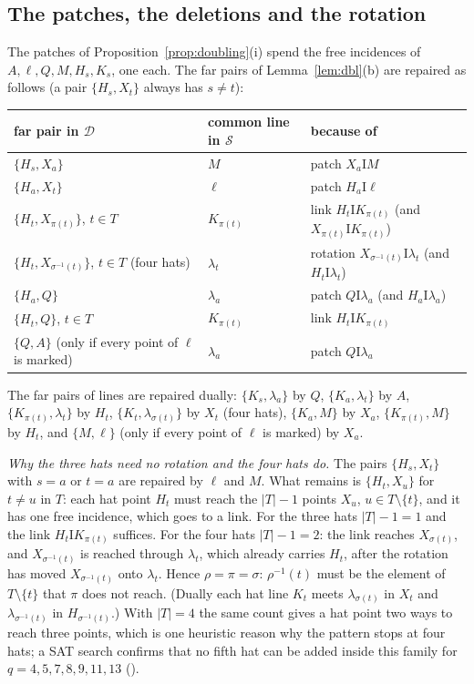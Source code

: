 \documentclass[11pt]{amsart}
\theoremstyle{definition}
\theoremstyle{remark}
\newcommand{\I}{\mathrel{\mathrm{I}}}
\newcommand{\cS}{\mathcal{S}}
\newcommand{\cD}{\mathcal{D}}
\newcommand{\lam}{\lambda}
\begin{document}
\subsection{The patches, the deletions and the rotation}\label{ssec:patches}
The patches of Proposition~\ref{prop:doubling}(i) spend the free incidences of $A,\ell,Q,M,H_s,K_s$, one each. The far pairs of Lemma~\ref{lem:dbl}(b) are repaired as follows (a pair $\{H_s,X_t\}$ always has $s\neq t$):

\begin{center}\small
\renewcommand{\arraystretch}{1.15}
\begin{tabular}{@{}lll@{}}
\toprule
far pair in $\cD$ & common line in $\cS$ & because of\\
\midrule
$\{H_s,X_a\}$ & $M$ & patch $X_a\I M$\\
$\{H_a,X_t\}$ & $\ell$ & patch $H_a\I\ell$\\
$\{H_t,X_{\pi(t)}\}$, $t\in T$ & $K_{\pi(t)}$ & link $H_t\I K_{\pi(t)}$ (and $X_{\pi(t)}\I K_{\pi(t)}$)\\
$\{H_t,X_{\sigma^{-1}(t)}\}$, $t\in T$ (four hats) & $\lam_t$ & rotation $X_{\sigma^{-1}(t)}\I\lam_t$ (and $H_t\I\lam_t$)\\
$\{H_a,Q\}$ & $\lam_a$ & patch $Q\I\lam_a$ (and $H_a\I\lam_a$)\\
$\{H_t,Q\}$, $t\in T$ & $K_{\pi(t)}$ & link $H_t\I K_{\pi(t)}$\\
$\{Q,A\}$ (only if every point of $\ell$ is marked) & $\lam_a$ & patch $Q\I\lam_a$\\
\bottomrule
\end{tabular}
\end{center}

\noindent The far pairs of lines are repaired dually: $\{K_s,\lam_a\}$ by $Q$, $\{K_a,\lam_t\}$ by $A$, $\{K_{\pi(t)},\lam_t\}$ by $H_t$, $\{K_t,\lam_{\sigma(t)}\}$ by $X_t$ (four hats), $\{K_a,M\}$ by $X_a$, $\{K_{\pi(t)},M\}$ by $H_t$, and $\{M,\ell\}$ (only if every point of $\ell$ is marked) by $X_a$.

\emph{Why the three hats need no rotation and the four hats do.} The pairs $\{H_s,X_t\}$ with $s=a$ or $t=a$ are repaired by $\ell$ and $M$. What remains is $\{H_t,X_u\}$ for $t\ne u$ in $T$: each hat point $H_t$ must reach the $|T|-1$ points $X_u$, $u\in T\setminus\{t\}$, and it has one free incidence, which goes to a link. For the three hats $|T|-1=1$ and the link $H_t\I K_{\pi(t)}$ suffices. For the four hats $|T|-1=2$: the link reaches $X_{\sigma(t)}$, and $X_{\sigma^{-1}(t)}$ is reached through $\lam_t$, which already carries $H_t$, after the rotation has moved $X_{\sigma^{-1}(t)}$ onto $\lam_t$. Hence $\rho=\pi=\sigma$: $\rho^{-1}(t)$ must be the element of $T\setminus\{t\}$ that $\pi$ does not reach. (Dually each hat line $K_t$ meets $\lam_{\sigma(t)}$ in $X_t$ and $\lam_{\sigma^{-1}(t)}$ in $H_{\sigma^{-1}(t)}$.) With $|T|=4$ the same count gives a hat point two ways to reach three points, which is one heuristic reason why the pattern stops at four hats; a SAT search confirms that no fifth hat can be added inside this family for $q=4,5,7,8,9,11,13$ ().
\end{document}
